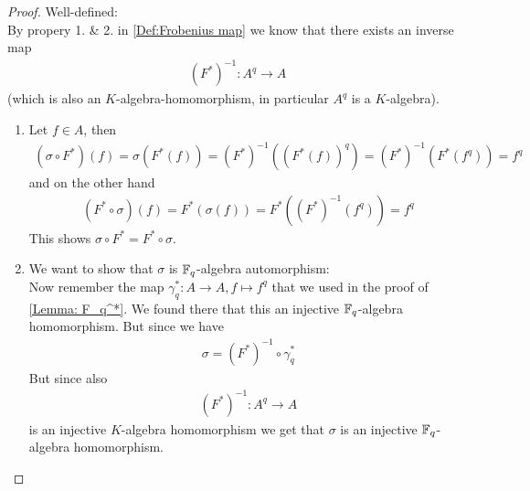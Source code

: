 \documentclass[]{article}
\begin{document}
\begin{proof}
    Well-defined: \\
    By propery 1. \& 2. in \ref{Def:Frobenius map} we know that there exists an inverse map
    \begin{align*}
        (F^*)^{-1}:A^q \rightarrow A
    \end{align*}
    (which is also an \(K\)-algebra-homomorphism, in particular \(A^q\) is a \(K\)-algebra).
    \begin{enumerate}
        \item Let \(f \in A\), then
        \begin{align*}
            (\sigma \circ F^*)(f)=\sigma(F^*(f))=(F^*)^{-1}((F^*(f))^q)=(F^*)^{-1}(F^*(f^q))=f^q
        \end{align*}
        and on the other hand
        \begin{align}
            (F^* \circ \sigma)(f)=F^*(\sigma(f))=F^*((F^*)^{-1}(f^q))=f^q
            \label{eq:Fstar_sigma}       
        \end{align}
        This shows \(\sigma \circ F^* = F^* \circ \sigma\).
        \item We want to show that \(\sigma\) is \({\mathbb{F}}_q\)-algebra automorphism: \\
        Now remember the map \(\gamma^*_q:A \rightarrow A, f \mapsto f^q\) that we used in the proof of \ref{Lemma: F_q^*}.
        We found there that this an injective \({\mathbb{F}}_q\)-algebra homomorphism. But since we have
        \begin{align*}
            \sigma = (F^*)^{-1} \circ \gamma^*_q
        \end{align*}
        But since also 
        \begin{align*}
        (F^*)^{-1}:A^q \rightarrow A
        \end{align*}
        is an injective \(K\)-algebra homomorphism we get that \(\sigma\) is an injective \({\mathbb{F}}_q\)-algebra homomorphism.
        

\end{enumerate}
\end{proof}
\end{document}
